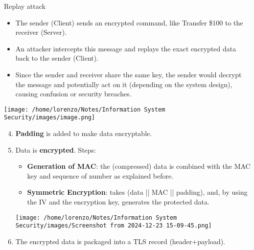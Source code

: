 \begin{quotebox-grey}{Replay attack}
    \begin{minipage}{0.6\textwidth}
    \begin{itemize}
        \item The sender (Client) sends an encrypted command, like Transfer \$100 to the receiver (Server).
        \item An attacker intercepts this message and replays the exact encrypted data back to the sender (Client).
        \item Since the sender and receiver share the same key, the sender would decrypt the message and potentially act on it (depending on the system design), causing confusion or security breaches.
    \end{itemize}
    
    \end{minipage} 
    \hspace{0.3cm}
    \begin{minipage}{0.4\textwidth}
        \centering
        \texttt{[image: /home/lorenzo/Notes/Information System Security/images/image.png]}
    \end{minipage}

\end{quotebox-grey}
\begin{enumerate}
\setcounter{enumi}{3}
\item \textbf{Padding} is added to make data 
encryptable.
\item Data is \textbf{encrypted}. Steps:
\\
\begin{minipage}{0.5\textwidth}
	
\begin{itemize}
    \vspace{-1cm}
    \item \textbf{Generation of MAC}: the (compressed) data is combined with the MAC key and sequence of number as explained before. 
    \item \textbf{Symmetric Encryption}: takes (data || MAC || padding), and, by using the IV and the encryption key, generates the protected data.
\end{itemize}
\end{minipage} 
\hspace{0.5cm}
\begin{minipage}{0.4\textwidth}
    \centering
    \texttt{[image: /home/lorenzo/Notes/Information System Security/images/Screenshot from 2024-12-23 15-09-45.png]}
\end{minipage}

\item The encrypted data is packaged into a TLS record (header+payload).
\end{enumerate}

\subsection{}




    

